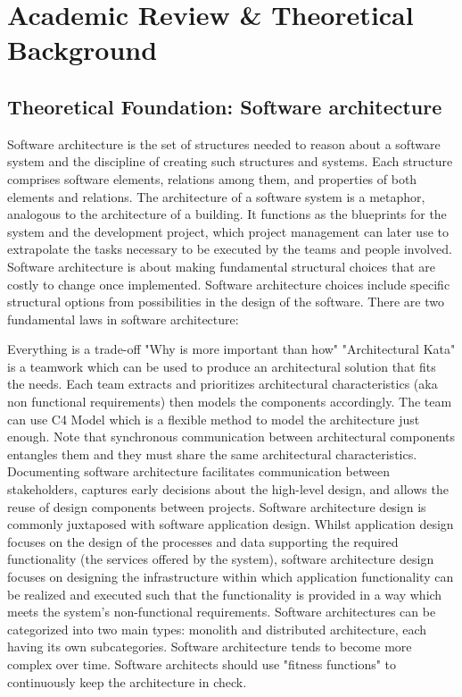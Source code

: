 \documentclass[12pt,a4paper]{report}
\begin{document}
\chapter{Academic Review \& Theoretical Background}
\section{Theoretical Foundation: Software architecture}
Software architecture is the set of structures needed to reason about a software system and the discipline of creating such structures and systems. Each structure comprises software elements, relations among them, and properties of both elements and relations.
The architecture of a software system is a metaphor, analogous to the architecture of a building. It functions as the blueprints for the system and the development project, which project management can later use to extrapolate the tasks necessary to be executed by the teams and people involved.
Software architecture is about making fundamental structural choices that are costly to change once implemented. Software architecture choices include specific structural options from possibilities in the design of the software. There are two fundamental laws in software architecture:

Everything is a trade-off
"Why is more important than how"
"Architectural Kata" is a teamwork which can be used to produce an architectural solution that fits the needs.  Each team extracts and prioritizes architectural characteristics (aka non functional requirements) then models the components accordingly. The team can use C4 Model which is a flexible method to model the architecture just enough. Note that synchronous communication between architectural components entangles them and they must share the same architectural characteristics.
Documenting software architecture facilitates communication between stakeholders, captures early decisions about the high-level design, and allows the reuse of design components between projects.
Software architecture design is commonly juxtaposed with software application design. Whilst application design focuses on the design of the processes and data supporting the required functionality (the services offered by the system), software architecture design focuses on designing the infrastructure within which application functionality can be realized and executed such that the functionality is provided in a way which meets the system's non-functional requirements.
Software architectures can be categorized into two main types: monolith and distributed architecture, each having its own subcategories.
Software architecture tends to become more complex over time. Software architects should use "fitness functions" to continuously keep the architecture in check.
\end{document}
